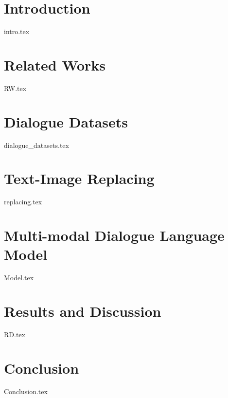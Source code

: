 \documentclass[runningheads]{llncs}
\begin{document}
\section{Introduction}
{intro.tex}


\section{Related Works}
{RW.tex}






\section{Dialogue Datasets}
{dialogue_datasets.tex}



\section{Text-Image Replacing}
{replacing.tex}

\section{Multi-modal Dialogue Language Model}
{Model.tex}


\section{Results and Discussion}
{RD.tex}


\section{Conclusion}
{Conclusion.tex}









%
%
%
% 
% 
%


\end{document}
